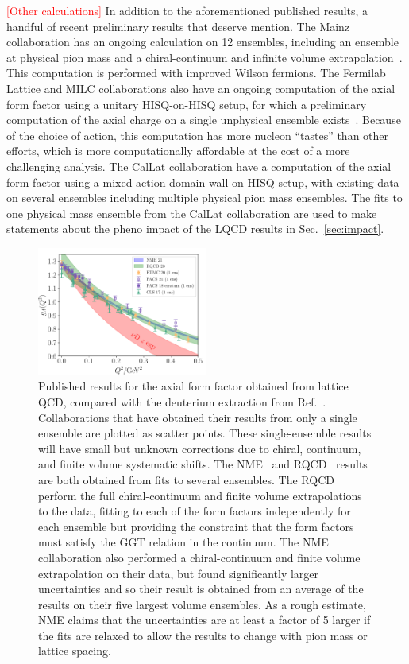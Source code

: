 \textcolor{red}{[Other calculations]}
In addition to the aforementioned published results,
 a handful of recent preliminary results that deserve mention.
The Mainz collaboration has an ongoing calculation on 12 ensembles,
 including an ensemble at physical pion mass
 and a chiral-continuum and infinite volume extrapolation~\cite{Djukanovic:2021yqg}.
This computation is performed with improved Wilson fermions.
The Fermilab Lattice and MILC collaborations also have an ongoing
 computation of the axial form factor using a unitary HISQ-on-HISQ setup,
 for which a preliminary computation of the axial charge on
 a single unphysical ensemble exists~\cite{Lin:2020wko}.
Because of the choice of action, this computation has more nucleon ``tastes''
 than other efforts, which is more computationally affordable
 at the cost of a more challenging analysis.
The CalLat collaboration have a computation of the axial form factor
 using a mixed-action domain wall on HISQ setup,
 with existing data on several ensembles including multiple physical pion mass ensembles.
The fits to one physical mass ensemble from the CalLat collaboration are used
 to make statements about the pheno impact of the LQCD results in Sec.~\ref{sec:impact}.

\begin{figure}[hbt!]
\centering
\includegraphics[width=0.5\textwidth]{plots/gaq2-overlay-standalone.pdf}
\caption{
Published results for the axial form factor obtained from lattice QCD,
 compared with the deuterium extraction from Ref.~\cite{Meyer:2016oeg}.
Collaborations that have obtained their results from only a single ensemble
 are plotted as scatter points.
These single-ensemble results will have small but unknown corrections due to chiral, continuum,
 and finite volume systematic shifts.
The NME~\cite{Park:2021ypf} and RQCD~\cite{RQCD:2019jai}
 results are both obtained from fits to several ensembles.
The RQCD perform the full chiral-continuum and finite volume extrapolations to the data,
 fitting to each of the form factors independently for each ensemble but providing
 the constraint that the form factors must satisfy the GGT relation in the continuum.
The NME collaboration also performed a chiral-continuum and finite volume extrapolation
 on their data, but found significantly larger uncertainties and so their result
 is obtained from an average of the results on their five largest volume ensembles.
As a rough estimate, NME claims that the uncertainties are at least a factor of 5 larger
 if the fits are relaxed to allow the results to change with pion mass or lattice spacing.
}
\end{figure}

